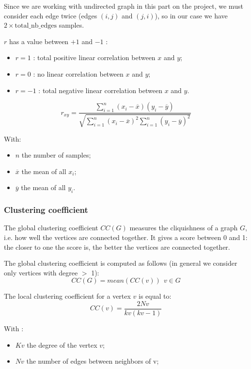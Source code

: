 \documentclass[table]{report}
\begin{document}
Since we are working with undirected graph in this part on the project, we must consider each edge twice (edges $(i,j)$ and $(j,i)$), so in our case we have 
$2 \times \textrm{total\_nb\_edges}$ samples.

$r$ has a value between $+1$ and $-1$ : 
\begin{itemize}[noitemsep]
	\item $r=1$  : total positive linear correlation between $x$ and $y$;
	\item $r=0$  : no linear correlation between $x$ and $y$;
	\item $r=-1$ : total negative linear correlation between $x$ and $y$.
\end{itemize}

$$\newcommand \xdiff    {(x_{i}-\overline {x})}
\newcommand   \ydiff    {(y_{i}-\overline {y})}
\newcommand   \sumassort{\sum_{i=1}^{n}}
r_{xy} = \dfrac{\sumassort \xdiff \ydiff } {\sqrt{\sumassort \xdiff^{2} \sumassort \ydiff^{2}}}$$

\noindent
With:
\begin{itemize}[noitemsep]

\item $n$ the number of samples;
\item $\overline{x}$ the mean of all $x_{i}$;
\item $\overline{y}$ the mean of all $y_{i}$.
\end{itemize}

\subsubsection{Clustering coefficient}

The global clustering coefficient $CC(G)$ measures the cliquishness of a graph $G$, i.e. how well the vertices are connected together. It gives a score between 0 and 1: the closer to one the score is, the better the vertices are connected together. 

\noindent
The global clustering coefficient is computed as follows (in general we consider only vertices  with degree $>$ 1):
$$CC(G) = mean(CC(v)) \ \  v \in G $$ 

\noindent
The local clustering coefficient for a vertex $v$ is equal to:
$$CC(v) = \dfrac{2Nv}{kv( kv-1) }$$

\noindent
With : 

\begin{itemize}[noitemsep]
    \item $Kv$ the degree of the vertex $v$;
    \item $Nv$ the number of edges between neighbors of v;
\end{itemize}
\end{document}
